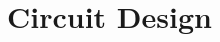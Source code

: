 \documentclass[a4paper,12pt,oneside,pdflatex,italian,final,twocolumn]{article}
\begin{document}
	\section{Circuit Design}
	
	
	
	

%
%
%
%
%
%
\end{document}
